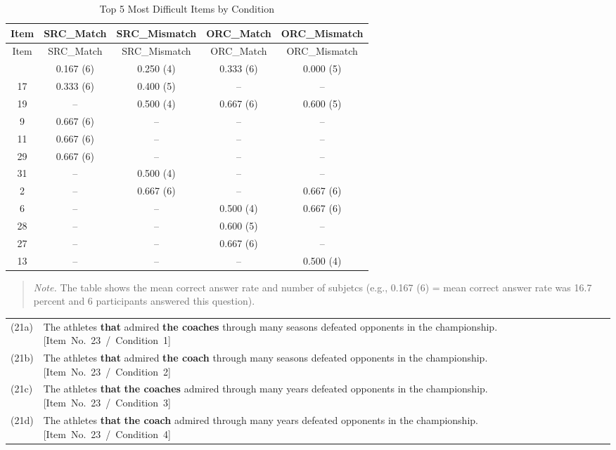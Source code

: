 \documentclass[
]{article}
\begin{document}
\begin{longtable}[]{@{}ccccc@{}}
\caption{Top 5 Most Difficult Items by Condition}\tabularnewline
\toprule\noalign{}
Item & SRC\_Match & SRC\_Mismatch & ORC\_Match & ORC\_Mismatch \\
\midrule\noalign{}
\endfirsthead
\toprule\noalign{}
Item & SRC\_Match & SRC\_Mismatch & ORC\_Match & ORC\_Mismatch \\
\midrule\noalign{}
\endhead
\bottomrule\noalign{}
\endlastfoot
23 & 0.167 (6) & 0.250 (4) & 0.333 (6) & 0.000 (5) \\
17 & 0.333 (6) & 0.400 (5) & -- & -- \\
19 & -- & 0.500 (4) & 0.667 (6) & 0.600 (5) \\
9 & 0.667 (6) & -- & -- & -- \\
11 & 0.667 (6) & -- & -- & -- \\
29 & 0.667 (6) & -- & -- & -- \\
31 & -- & 0.500 (4) & -- & -- \\
2 & -- & 0.667 (6) & -- & 0.667 (6) \\
6 & -- & -- & 0.500 (4) & 0.667 (6) \\
28 & -- & -- & 0.600 (5) & -- \\
27 & -- & -- & 0.667 (6) & -- \\
13 & -- & -- & -- & 0.500 (4) \\
\end{longtable}

\vspace{-0.5em}
\begin{quote}
\textit{Note.} The table shows the mean correct answer rate and number of subjetcs (e.g., 0.167 (6) = mean correct answer rate was 16.7 percent and 6 participants answered this question).
\end{quote}
\vspace{1em}

\clearpage

\vspace{1em}
\noindent
\begin{tabularx}{\linewidth}{@{}l@{\hspace{0.5em}}X@{}}
(21a) & The athletes \textbf{that} admired \textbf{the coaches} through many seasons defeated opponents in the championship. \hfill \mbox{[Item No. 23 / Condition 1]} \\
(21b) & The athletes \textbf{that} admired \textbf{the coach} through many seasons defeated opponents in the championship. \hfill \mbox{[Item No. 23 / Condition 2]} \\
(21c) & The athletes \textbf{that} \textbf{the coaches} admired through many years defeated opponents in the championship. \hfill \mbox{[Item No. 23 / Condition 3]} \\
(21d) & The athletes \textbf{that} \textbf{the coach} admired through many years defeated opponents in the championship. \hfill \mbox{[Item No. 23 / Condition 4]} \\
\end{tabularx}
\vspace{1em}
\end{document}
